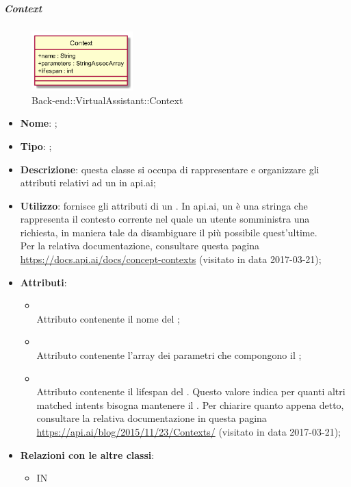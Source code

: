 \hypertarget{Context_label}{\subparagraph{Context}}
\begin{figure}[h]
	\centering
	\includegraphics[width=0.35\textwidth,height=\textheight,keepaspectratio]{images/ClassContext.png}
	\caption{Back-end::VirtualAssistant::Context}
\end{figure}
\begin{itemize}
	\item \textbf{Nome}: ;
	\item \textbf{Tipo}: ;
	\item \textbf{Descrizione}: questa classe si occupa di rappresentare e organizzare gli attributi relativi ad un  in api.ai;
	\item \textbf{Utilizzo}: fornisce gli attributi di un .
	In api.ai, un  è una stringa che rappresenta il contesto corrente nel quale un utente somministra una richiesta, in maniera tale da disambiguare il più possibile quest'ultime. \\
	Per la relativa documentazione, consultare questa pagina \url{https://docs.api.ai/docs/concept-contexts} (visitato in data 2017-03-21);
	\item \textbf{Attributi}:
	\begin{itemize}
		\item[]  \\
		Attributo contenente il nome del ;
		\item[]  \\
		Attributo contenente l'array dei parametri che compongono il ;
		\item[]  \\
		Attributo contenente il lifespan del .
		Questo valore indica per quanti altri matched intents bisogna mantenere il .
		Per chiarire quanto appena detto, consultare la relativa documentazione in questa pagina \\ \url{https://api.ai/blog/2015/11/23/Contexts/}  (visitato in data 2017-03-21);
	\end{itemize}
	\item \textbf{Relazioni con le altre classi}:
	\begin{itemize}
		\item IN \hyperlink{ProcessingResult_label}{}
	\end{itemize}
\end{itemize}
\FloatBarrier

